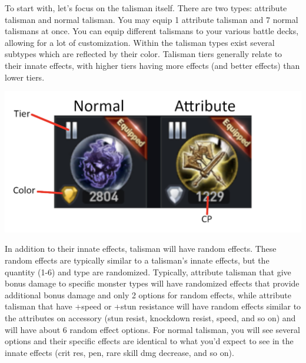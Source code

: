\documentclass[]{article}
\begin{document}
To start with, let's focus on the talisman itself.
There are two types: attribute talisman and normal talisman.
You may equip 1 attribute talisman and 7 normal talismans at once.
You can equip different talismans to your various battle decks, allowing for a lot of customization.
Within the talisman types exist several subtypes which are reflected by their color.
Talisman tiers generally relate to their innate effects, with higher tiers having more effects (and better effects) than lower tiers.

\begin{center}
\includegraphics{talis2}
\end{center}

In addition to their innate effects, talisman will have random effects.
These random effects are typically similar to a talisman's innate effects, but the quantity (1-6) and type are randomized.
Typically, attribute talisman that give bonus damage to specific monster types will have randomized effects that provide additional bonus damage and only 2 options for random effects, while attribute talisman that have +speed or +stun resistance will have random effects similar to the attributes on accessory (stun resist, knockdown resist, speed, and so on) and will have about 6 random effect options.
For normal talisman, you will see several options and their specific effects are identical to what you'd expect to see in the innate effects (crit res, pen, rare skill dmg decrease, and so on).
 
\end{document}
